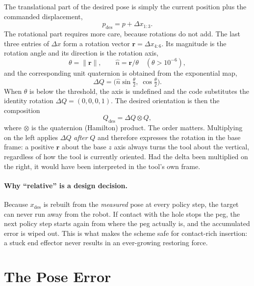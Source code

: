 \documentclass{article}
\newcommand{\des}{\mathrm{des}}
\begin{document}
The translational part of the desired pose is simply the current position plus the commanded displacement,
\begin{equation}
  p_\des = p + \Delta x_{1:3}.
\end{equation}
The rotational part requires more care, because rotations do not add. The last three entries of $\Delta x$ form a rotation vector $\mathbf r=\Delta x_{4:6}$. Its magnitude is the rotation angle and its direction is the rotation axis,
\begin{equation}
  \theta = \lVert\mathbf r\rVert, \qquad \hat n = \mathbf r/\theta \quad (\theta>10^{-6}),
\end{equation}
and the corresponding unit quaternion is obtained from the exponential map,
\begin{equation}
  \Delta Q = \big(\hat n\sin\tfrac{\theta}{2},\;\cos\tfrac{\theta}{2}\big).
\end{equation}
When $\theta$ is below the threshold, the axis is undefined and the code substitutes the identity rotation $\Delta Q=(0,0,0,1)$. The desired orientation is then the composition
\begin{equation}
  Q_\des = \Delta Q\otimes Q,
  \label{eq:qdes}
\end{equation}
where $\otimes$ is the quaternion (Hamilton) product. The order matters. Multiplying on the left applies $\Delta Q$ \emph{after} $Q$ and therefore expresses the rotation in the base frame: a positive $\mathbf r$ about the base $z$ axis always turns the tool about the vertical, regardless of how the tool is currently oriented. Had the delta been multiplied on the right, it would have been interpreted in the tool's own frame.

\paragraph{Why ``relative'' is a design decision.}
Because $x_\des$ is rebuilt from the \emph{measured} pose at every policy step, the target can never run away from the robot. If contact with the hole stops the peg, the next policy step starts again from where the peg actually is, and the accumulated error is wiped out. This is what makes the scheme safe for contact-rich insertion: a stuck end effector never results in an ever-growing restoring force.

\section{The Pose Error}
\label{sec:error}
\end{document}
